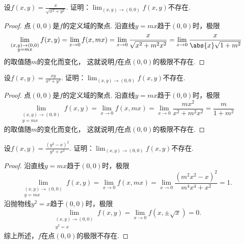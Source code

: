 \begin{example}
设\(f(x,y) = \frac{x}{\sqrt{x^2+y^2}}\).
证明：\(\lim_{(x,y)\to(0,0)} f(x,y)\)不存在.
\begin{proof}
点\((0,0)\)是\(f\)的定义域的聚点.
沿直线\(y=mx\)趋于\((0,0)\)时，极限\begin{equation*}
	\lim_{\substack{(x,y)\to(0,0) \\ y=mx}} f(x,y)
	= \lim_{x\to0} f(x,mx)
	= \lim_{x\to0} \frac{x}{\sqrt{x^2+m^2x^2}}
	= \lim_{x\to0} \frac{x}{\abs{x} \sqrt{1+m^2}}
\end{equation*}的取值随\(m\)的变化而变化，
这就说明\(f\)在点\((0,0)\)的极限不存在.
\end{proof}
\end{example}
\begin{example}
设\(f(x,y) = \frac{xy}{x^2+y^2}\).
证明：\(\lim_{(x,y)\to(0,0)} f(x,y)\)不存在.
\begin{proof}
点\((0,0)\)是\(f\)的定义域的聚点.
沿直线\(y=mx\)趋于\((0,0)\)时，极限\begin{equation*}
	\lim_{\substack{(x,y)\to(0,0) \\ y=mx}} f(x,y)
	= \lim_{x\to0} f(x,mx)
	= \lim_{x\to0} \frac{mx^2}{x^2+m^2x^2}
	= \frac{m}{1+m^2}
\end{equation*}的取值随\(m\)的变化而变化，
这就说明\(f\)在点\((0,0)\)的极限不存在.
\end{proof}
\end{example}
\begin{example}
设\(f(x,y) = \frac{(y^2-x)^2}{y^4+x^2}\).
证明：\(\lim_{(x,y)\to(0,0)} f(x,y)\)不存在.
\begin{proof}
沿直线\(y=mx\)趋于\((0,0)\)时，极限\begin{equation*}
	\lim_{\substack{(x,y)\to(0,0) \\ y=mx}} f(x,y)
	= \lim_{x\to0} f(x,mx)
	= \lim_{x\to0} \frac{(m^2x^2-x)^2}{m^4x^4+x^2}
	= 1.
\end{equation*}
沿抛物线\(y^2=x\)趋于\((0,0)\)时，极限\begin{equation*}
	\lim_{\substack{(x,y)\to(0,0) \\ y^2=x}} f(x,y)
	= \lim_{x\to0} f(x,\pm\sqrt{x})
	= 0.
\end{equation*}
综上所述，\(f\)在点\((0,0)\)的极限不存在.
\end{proof}
\end{example}

